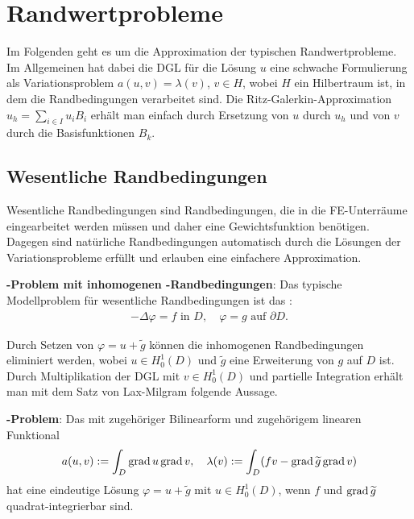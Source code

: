 \section{%
    Randwertprobleme%
}

Im Folgenden geht es um die Approximation der typischen Randwertprobleme.
Im Allgemeinen hat dabei die DGL für die Lösung $u$ eine schwache Formulierung
als Variationsproblem $a(u, v) = \lambda(v)$, $v \in H$,
wobei $H$ ein Hilbertraum ist, in dem die Randbedingungen verarbeitet sind.
Die Ritz-Galerkin-Approximation $u_h = \sum_{i \in I} u_i B_i$ erhält man einfach durch
Ersetzung von $u$ durch $u_h$ und von $v$ durch die Basisfunktionen $B_k$.

\subsection{%
    Wesentliche Randbedingungen%
}

Wesentliche Randbedingungen sind Randbedingungen, die in die FE-Unterräume eingearbeitet werden
müssen und daher eine Gewichtsfunktion benötigen.
Dagegen sind natürliche Randbedingungen automatisch durch die Lösungen der Variationsprobleme
erfüllt und erlauben eine einfachere Approximation.

\textbf{-Problem mit inhomogenen -Randbedingungen}:
Das typische Modellproblem für wesentliche Randbedingungen ist das
:
\begin{align*}
    -\Delta \varphi = f \text{ in } D,\quad
    \varphi = g \text{ auf } \partial D.
\end{align*}

Durch Setzen von $\varphi = u + \widetilde{g}$ können die inhomogenen Randbedingungen eliminiert
werden, wobei $u \in H_0^1(D)$ und $\widetilde{g}$ eine Erweiterung von $g$ auf $D$ ist.
Durch Multiplikation der DGL mit $v \in H_0^1(D)$ und partielle Integration erhält man
mit dem Satz von Lax-Milgram folgende Aussage.

\textbf{-Problem}:
Das 
mit zugehöriger Bilinearform und zugehörigem linearen Funktional
\begin{align*}
    a(u, v) := \int_D \operatorname{grad} u \operatorname{grad} v,\quad
    \lambda(v) := \int_D (fv - \operatorname{grad} \widetilde{g} \operatorname{grad} v)
\end{align*}
hat eine eindeutige Lösung $\varphi = u + \widetilde{g}$ mit $u \in H_0^1(D)$,
wenn $f$ und $\operatorname{grad} \widetilde{g}$ quadrat-integrierbar sind.

